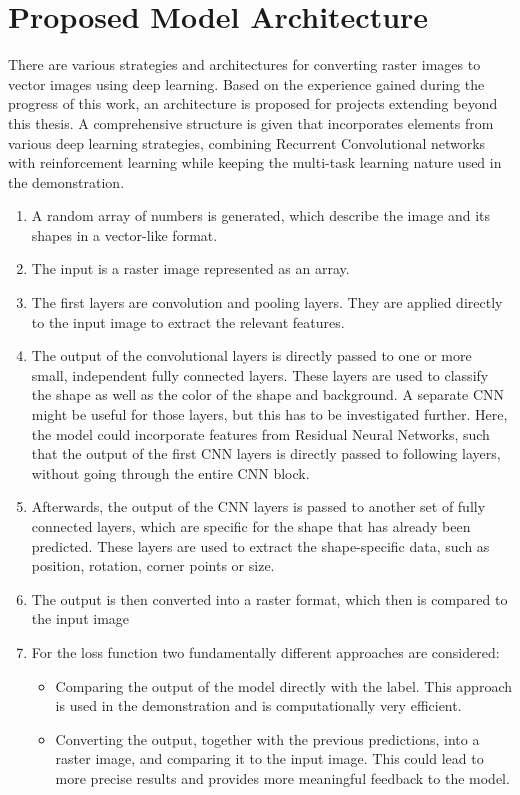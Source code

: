 \documentclass[12pt, a4paper, titlepage]{report}
\begin{document}
\section{Proposed Model Architecture}

There are various strategies and architectures for converting raster images to vector images using deep learning. Based on the experience gained during the progress of this work, an architecture is proposed for projects extending beyond this thesis. A comprehensive structure is given that incorporates elements from various deep learning strategies, combining Recurrent Convolutional networks with reinforcement learning while keeping the multi-task learning nature used in the demonstration.

\begin{enumerate}[label=\Roman*.]
   \item A random array of numbers is generated, which describe the image and its shapes in a vector-like format.
   \item The input is a raster image represented as an array.
   \item The first layers are convolution and pooling layers. They are applied directly to the input image to extract the relevant features.
   \item The output of the convolutional layers is directly passed to one or more small, independent fully connected layers. These layers are used to classify the shape as well as the color of the shape and background. A separate CNN might be useful for those layers, but this has to be investigated further. Here, the model could incorporate features from Residual Neural Networks, such that the output of the first CNN layers is directly passed to following layers, without going through the entire CNN block.
   \item Afterwards, the output of the CNN layers is passed to another set of fully connected layers, which are specific for the shape that has already been predicted. These layers are used to extract the shape-specific data, such as position, rotation, corner points or size.
   \item The output is then converted into a raster format, which then is compared to the input image

   \item For the loss function two fundamentally different approaches are considered:
      \begin{itemize}
         \item Comparing the output of the model directly with the label. This approach is used in the demonstration and is computationally very efficient.
         \item Converting the output, together with the previous predictions, into a raster image, and comparing it to the input image. This could lead to more precise results and provides more meaningful feedback to the model.
      \end{itemize}


\end{enumerate}
\end{document}
